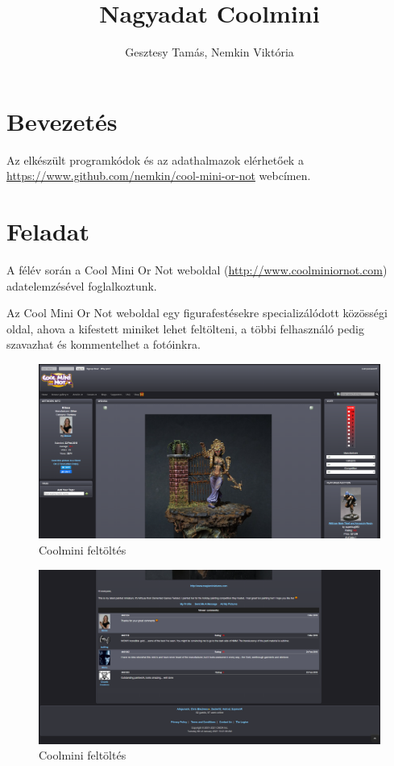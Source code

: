 \documentclass[14pt,a4paper]{article}
\title{Nagyadat Coolmini}
\author{Gesztesy Tamás, Nemkin Viktória}
\date{}
\begin{document}
\maketitle

\section{Bevezetés}

Az elkészült programkódok és az adathalmazok elérhetőek a
\href{https://www.github.com/nemkin/cool-mini-or-not}{\url{https://www.github.com/nemkin/cool-mini-or-not}} webcímen.

\section{Feladat}

A félév során a Cool Mini Or Not weboldal (\href{http://www.coolminiornot.com}{\url{http://www.coolminiornot.com}})
adatelemzésével foglalkoztunk.

Az Cool Mini Or Not weboldal egy figurafestésekre specializálódott közösségi oldal, ahova a kifestett miniket
lehet feltölteni, a többi felhasználó pedig szavazhat és kommentelhet a fotóinkra.

\begin{figure}[H]
\centering
\includegraphics[width=1.0\columnwidth]{pics/page_submission.png}
\caption{Coolmini feltöltés}
\end{figure}

\begin{figure}[H]
\centering
\includegraphics[width=1.0\columnwidth]{pics/page_comments.png}
\caption{Coolmini feltöltés}
\end{figure}
\end{document}
